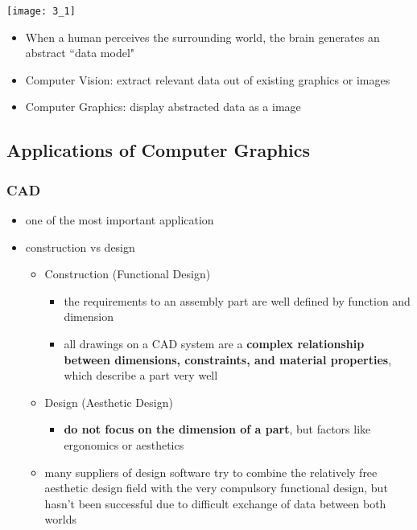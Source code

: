 \documentclass{standalone}
\begin{document}
\texttt{[image: 3\_1]}

\begin{itemize}
	\item When a human perceives the surrounding world, the brain generates an abstract ``data model"
	\item Computer Vision: extract relevant data out of existing graphics or images
	\item Computer Graphics: display abstracted data as a image
\end{itemize}

\subsection{Applications of Computer Graphics}

\subsubsection{CAD}

\begin{itemize}
	\item one of the most important application 
	\item construction vs design
		\begin{itemize}
			\item Construction (Functional Design)
				\begin{itemize}
					\item the requirements to an assembly part are well defined by function and dimension
					\item all drawings on a CAD system are a \textbf{complex relationship between dimensions, constraints, and material properties}, which describe a part very well
				\end{itemize}
				\item Design (Aesthetic Design)
				\begin{itemize}
					\item \textbf{do not focus on the dimension of a part}, but factors like ergonomics or aesthetics
				\end{itemize}
			\item many suppliers of design software try to combine the relatively free aesthetic design field with the very compulsory functional design, but hasn't been successful due to difficult exchange of data between both worlds
		\end{itemize}
\end{itemize}
\end{document}
